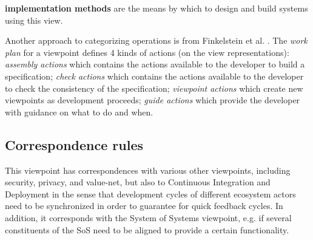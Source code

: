 {\textbf{implementation methods} are the means by which to design and build systems using this view.


Another approach to categorizing operations is from Finkelstein et
al. \cite{Finkelstein+1992}. The \emph{work plan} for a viewpoint
defines 4 kinds of actions (on the view representations):
\textit{assembly actions} which contains the actions available to the
developer to build a specification; \textit{check actions} which
contains the actions available to the developer to check the
consistency of the specification; \textit{viewpoint actions} which
create new viewpoints as development proceeds; \textit{guide actions}
which provide the developer with guidance on what to do and when.
}



\subsection{Correspondence rules}\label{CRs}

{This viewpoint has correspondences with various other viewpoints, including security, privacy, and value-net, but also to Continuous Integration and Deployment in the sense that development cycles of different ecosystem actors need to be synchronized in order to guarantee for quick feedback cycles. 
In addition, it corresponds with the System of Systems viewpoint, e.g. if several constituents of the SoS need to be aligned to provide a certain functionality.}




